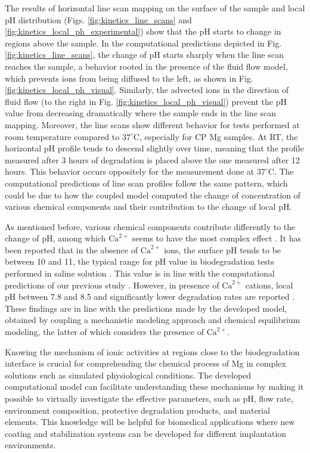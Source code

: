 The results of horizontal line scan mapping on the surface of the sample and local pH distribution (Figs. \ref{fig:kinetics_line_scans} and \ref{fig:kinetics_local_ph_experimental}) show that the pH starts to change in regions above the sample. In the computational predictions depicted in Fig. \ref{fig:kinetics_line_scans}, the change of pH starts sharply when the line scan reaches the sample, a behavior rooted in the presence of the fluid flow model, which prevents ions from being diffused to the left, as shown in Fig. \ref{fig:kinetics_local_ph_visual}. Similarly, the advected ions in the direction of fluid flow (to the right in Fig. \ref{fig:kinetics_local_ph_visual}) prevent the pH value from decreasing dramatically where the sample ends in the line scan mapping. Moreover, the line scans show different behavior for tests performed at room temperature compared to $37^{\circ}\text{C}$, especially for \gls{CP} Mg samples. At \gls{RT}, the horizontal pH profile tends to descend slightly over time, meaning that the profile measured after 3 hours of degradation is placed above the one measured after 12 hours. This behavior occurs oppositely for the measurement done at $37^{\circ}\text{C}$. The computational predictions of line scan profiles follow the same pattern, which could be due to how the coupled model computed the change of concentration of various chemical components and their contribution to the change of local pH.

As mentioned before, various chemical components contribute differently to the change of pH, among which $\mathrm{Ca}^{2+}$ seems to have the most complex effect \cite{Willumeit-Roemer2019}. It has been reported that in the absence of $\mathrm{Ca}^{2+}$ ions, the surface pH tends to be between 10 and 11, the typical range for pH value in biodegradation tests performed in saline solution \cite{Gonzalez2021}. This value is in line with the computational predictions of our previous study \cite{Barzegari2021}. However, in presence of $\mathrm{Ca}^{2+}$ cations, local pH between 7.8 and 8.5 and significantly lower degradation rates are reported \cite{Mei2019,Gnedenkov2019,Tefashe2015,Lamaka2009}. These findings are in line with the predictions made by the developed model, obtained by coupling a mechanistic modeling approach and chemical equilibrium modeling, the latter of which considers the presence of $\mathrm{Ca}^{2+}$.

Knowing the mechanism of ionic activities at regions close to the biodegradation interface is crucial for comprehending the chemical process of Mg in complex solutions such as simulated physiological conditions. The developed computational model can facilitate understanding these mechanisms by making it possible to virtually investigate the effective parameters, such as pH, flow rate, environment composition, protective degradation products, and material elements. This knowledge will be helpful for biomedical applications where new coating and stabilization systems can be developed for different implantation environments.

